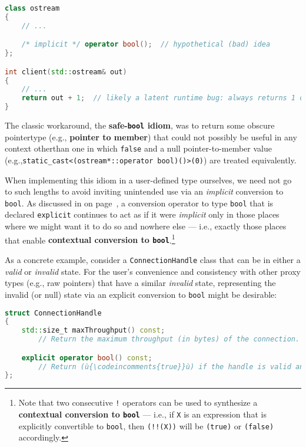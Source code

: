 \begin{lstlisting}[language=C++]
class ostream
{
    // ...

    /* implicit */ operator bool();  // hypothetical (bad) idea
};

int client(std::ostream& out)
{
    // ...
    return out + 1;  // likely a latent runtime bug: always returns 1 or 2
}
\end{lstlisting}

\noindent The classic workaround, the \textbf{safe-\texttt{bool} idiom},
was to return some obscure pointer\linebreak[4] %
 type (e.g., \textbf{pointer to
member}) that could not possibly be useful in any context other\linebreak[4] %
 than one in which \texttt{false} and a null pointer-to-member value (e.g.,\linebreak[4] %
\texttt{static\_cast<(ostream*::operator}~\texttt{bool)()>(0)}) are
treated equivalently.

When implementing this idiom in a user-defined type ourselves, we need not go to such lengths to avoid inviting unintended use
via an \emph{implicit} conversion to \texttt{bool}. As discussed in \textit{} on page~\pageref{description-explicitconv}, a conversion operator to type
\texttt{bool} that is declared \texttt{explicit} continues to act as if
it were \emph{implicit} only in those places where we might want it to
do so and nowhere else --- i.e., exactly those places that enable
\textbf{contextual conversion to \texttt{bool}}.{\cprotect\footnote{Note that two
consecutive \texttt{!} operators can be used to synthesize a
\textbf{contextual conversion to \texttt{bool}} --- i.e., if \texttt{X} is an
expression that is explicitly convertible to \texttt{bool}, then
\texttt{(!!(X))} will be \texttt{(true)} or \texttt{(false)}
  accordingly.}}

As a concrete example, consider a \texttt{ConnectionHandle} class that
can be in either a \emph{valid} or \emph{invalid} state. For the user's
convenience and consistency with other proxy types (e.g., raw pointers)
that have a similar \emph{invalid} state, representing the invalid (or null) state via an explicit conversion to
\texttt{bool} might be desirable:

\begin{lstlisting}[language=C++]
struct ConnectionHandle
{
    std::size_t maxThroughput() const;
        // Return the maximum throughput (in bytes) of the connection.

    explicit operator bool() const;
        // Return (ù{\codeincomments{true}}ù) if the handle is valid and (ù{\codeincomments{false}}ù) otherwise.
};
\end{lstlisting}

